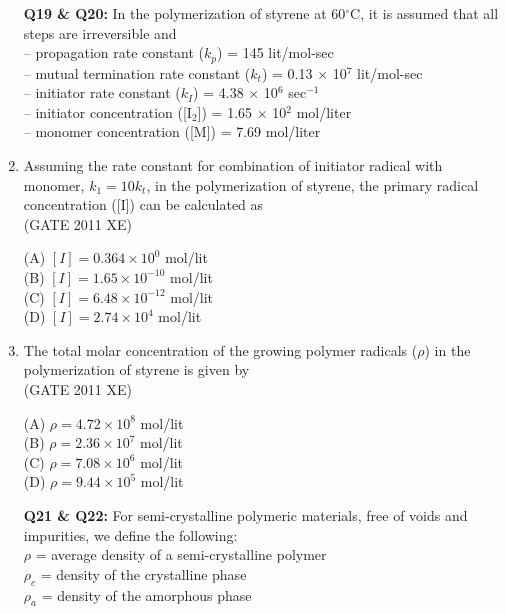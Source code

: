 \documentclass[journal,12pt,onecolumn]{IEEEtran}
\begin{document}
\begin{enumerate}
\begin{enumerate}
\begin{enumerate}[label=\arabic*)]
\item[\textbf{Q19 \& Q20:}] In the polymerization of styrene at 60$^\circ$C, it is assumed that all steps are irreversible and\\
-- propagation rate constant ($k_p$) = 145 lit/mol-sec\\
-- mutual termination rate constant ($k_t$) = 0.13 $\times$ 10$^7$ lit/mol-sec\\
-- initiator rate constant ($k_I$) = 4.38 $\times$ 10$^6$ sec$^{-1}$\\
-- initiator concentration ([I$_2$]) = 1.65 $\times$ 10$^2$ mol/liter\\
-- monomer concentration ([M]) = 7.69 mol/liter\\

\item Assuming the rate constant for combination of initiator radical with monomer, $k_1 = 10 k_t$, in the polymerization of styrene, the primary radical concentration ([I]) can be calculated as\\

\hfill{(GATE 2011 XE)} \\
\begin{multicols}{4}
(A) $[I] = 0.364 \times 10^0$ mol/lit\\
(B) $[I] = 1.65 \times 10^{-10}$ mol/lit\\
(C) $[I] = 6.48 \times 10^{-12}$ mol/lit\\
(D) $[I] = 2.74 \times 10^4$ mol/lit
\end{multicols}

\item The total molar concentration of the growing polymer radicals ($\rho$) in the polymerization of styrene is given by\\

\hfill{(GATE 2011 XE)} \\
\begin{multicols}{4}
(A) $\rho = 4.72 \times 10^8$ mol/lit\\
(B) $\rho = 2.36 \times 10^7$ mol/lit\\
(C) $\rho = 7.08 \times 10^6$ mol/lit\\
(D) $\rho = 9.44 \times 10^5$ mol/lit
\end{multicols}


\item[\textbf{Q21 \& Q22:}] For semi-crystalline polymeric materials, free of voids and impurities, we define the following:\\
$\rho$ = average density of a semi-crystalline polymer\\
$\rho_c$ = density of the crystalline phase\\
$\rho_a$ = density of the amorphous phase\\


\end{enumerate}
\end{enumerate}
\end{enumerate}
\end{document}
